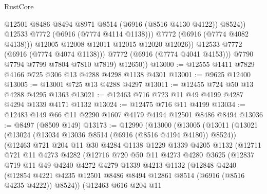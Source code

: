 \begin{lexlean}{RustCore}
\begin{coremodule}
                          @12501
                          @8486
                          @8494
                          @8971
                          @8514
                          (@6916 (@8516 @4130 @4122))
                          @8524))
                      @12533
                      @7772
                      (@6916 (@7774 @4114 @1138)))
                    @7772
                    (@6916 (@7774 @4082 @4138)))
                  @12005
                  @12008
                  @12011
                  @12015
                  @12020
                  @12026))
              @12533
              @7772
              (@6916 (@7774 @4074 @1138)))
            @7772
            (@6916 (@7774 @4041 @4153)))
          @7790
          @7794
          @7799
          @7804
          @7810
          @7819)
        @12650))
@13000 := @12555 @1411 @7829 @4166 @725 @306 @13 @4288 @4298 @1138 @4301
@13001 := @9625 @12400
@13005 := @13001 @725 @13 @4288 @4297
@13011 := @12455 @724 @50 @13 @4288 @4295 @1363
@13021 := @12463 @716 @723 @11 @49 @4199 @4287 @4294 @1339 @4171 @1132
@13024 := @12475 @716 @11 @4199
@13034 := @12483 @149 @66 @11 @2290 @1607 @4179 @4194 @12501 @8486 @8494
@13036 := @8497 (@8509 @149)
@13173 := @12990
    (@13000
      (@13005
        (@13011
          (@13021
            (@13024 (@13034 @13036 @8514 (@6916 (@8516 @4194 @4180)) @8524))
            (@12463
              @721
              @204
              @11
              @30
              @4284
              @1138
              @1229
              @1339
              @4205
              @1132
              (@12711
                @721
                @11
                @4273
                @4282
                (@12716
                  @720
                  @50
                  @11
                  @4273
                  @4280
                  @3625
                  (@12837
                    @719
                    @11
                    @49
                    @4240
                    @4272
                    @4279
                    @1339
                    @4213
                    @1132
                    (@12848
                      @4240
                      (@12854
                        @4221
                        @4235
                        @12501
                        @8486
                        @8494
                        @12861
                        @8514
                        (@6916 (@8516 @4235 @4222))
                        @8524))
                    (@12463
                      @616
                      @204
                      @11

\end{coremodule}
\end{lexlean}
